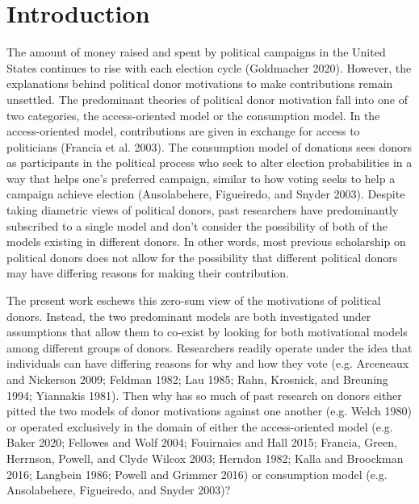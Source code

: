 \documentclass[12pt,]{article}
\begin{document}
\newpage

\hypertarget{introduction}{%
\section{Introduction}\label{introduction}}

The amount of money raised and spent by political campaigns in the
United States continues to rise with each election cycle (Goldmacher
2020). However, the explanations behind political donor motivations to
make contributions remain unsettled. The predominant theories of
political donor motivation fall into one of two categories, the
access-oriented model or the consumption model. In the access-oriented
model, contributions are given in exchange for access to politicians
(Francia et al. 2003). The consumption model of donations sees donors as
participants in the political process who seek to alter election
probabilities in a way that helps one's preferred campaign, similar to
how voting seeks to help a campaign achieve election (Ansolabehere,
Figueiredo, and Snyder 2003). Despite taking diametric views of
political donors, past researchers have predominantly subscribed to a
single model and don't consider the possibility of both of the models
existing in different donors. In other words, most previous scholarship
on political donors does not allow for the possibility that different
political donors may have differing reasons for making their
contribution.

The present work eschews this zero-sum view of the motivations of
political donors. Instead, the two predominant models are both
investigated under assumptions that allow them to co-exist by looking
for both motivational models among different groups of donors.
Researchers readily operate under the idea that individuals can have
differing reasons for why and how they vote (e.g. Arceneaux and
Nickerson 2009; Feldman 1982; Lau 1985; Rahn, Krosnick, and Breuning
1994; Yiannakis 1981). Then why has so much of past research on donors
either pitted the two models of donor motivations against one another
(e.g. Welch 1980) or operated exclusively in the domain of either the
access-oriented model (e.g. Baker 2020; Fellowes and Wolf 2004;
Fouirnaies and Hall 2015; Francia, Green, Herrnson, Powell, and Clyde
Wilcox 2003; Herndon 1982; Kalla and Broockman 2016; Langbein 1986;
Powell and Grimmer 2016) or consumption model (e.g. Ansolabehere,
Figueiredo, and Snyder 2003)?
\end{document}
